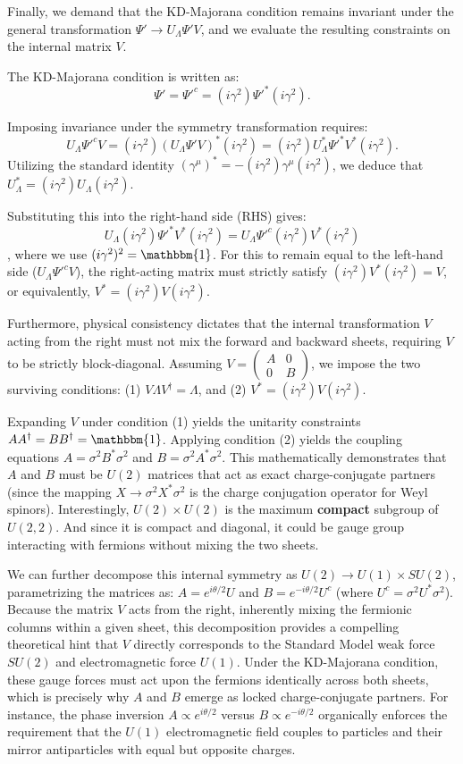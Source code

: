 Finally, we demand that the KD-Majorana condition remains invariant under the general transformation $\Psi'\to U_\Lambda\Psi'V$, and we evaluate the resulting constraints on the internal matrix $V$.

The KD-Majorana condition is written as: 
\[\Psi'=\Psi'^c =(i\gamma^2)\Psi'^*(i\gamma^2).\]

Imposing invariance under the symmetry transformation requires:
\[ U_\Lambda\Psi'^cV=(i\gamma^2)(U_\Lambda\Psi'V)^*(i\gamma^2)
    =(i\gamma^2)U_\Lambda^*\Psi'^*V^*(i\gamma^2). \]
Utilizing the standard identity $(\gamma^\mu)^*=-(i\gamma^2)\gamma^\mu(i\gamma^2)$, we deduce that $U_\Lambda^*=(i\gamma^2)U_\Lambda(i\gamma^2)$.

Substituting this into the right-hand side (RHS) gives: 
\[ U_\Lambda(i\gamma^2)\Psi'^*V^*(i\gamma^2)=U_\Lambda\Psi'^c(i\gamma^2)V^*(i\gamma^2)\], where we use $(i\gamma^2)^2=\mathbbm{1}$.
For this to remain equal to the left-hand side ($U_\Lambda\Psi'^cV$), the right-acting matrix must strictly satisfy $(i\gamma^2)V^*(i\gamma^2)=V$, or equivalently, $V^*=(i\gamma^2)V(i\gamma^2)$.

Furthermore, physical consistency dictates that the internal transformation $V$ acting from the right must not mix the forward and backward sheets, requiring $V$ to be strictly block-diagonal. 
Assuming $V=\begin{pmatrix} A & 0\\0&B\end{pmatrix}$, we impose the two surviving conditions: (1) $V\Lambda V^\dagger=\Lambda$, and (2) $V^*=(i\gamma^2)V(i\gamma^2)$.

Expanding $V$ under condition (1) yields the unitarity constraints $AA^\dagger=BB^\dagger=\mathbbm{1}$.
Applying condition (2) yields the coupling equations $A=\sigma^2B^*\sigma^2$ and $B=\sigma^2A^*\sigma^2$. 
This mathematically demonstrates that $A$ and $B$ must be $U(2)$ matrices that act as exact charge-conjugate partners (since the mapping $X\to \sigma^2 X^*\sigma^2$ is the charge conjugation operator for Weyl spinors). Interestingly, $U(2)\times U(2)$ is the maximum \textbf{compact} subgroup of $U(2,2)$. And since it is compact and diagonal, it could be gauge group interacting with fermions without mixing the two sheets. 

We can further decompose this internal symmetry as $U(2)\to U(1)\times SU(2)$, parametrizing the matrices as: 
$A=e^{i\theta/2}U$ and $B=e^{-i\theta/2}U^c$ (where $U^c=\sigma^2 U^*\sigma^2$). Because the matrix $V$ acts from the right, inherently mixing the fermionic columns within a given sheet, this decomposition provides a compelling theoretical hint that $V$ directly corresponds to the Standard Model weak force $SU(2)$ and electromagnetic force $U(1)$. Under the KD-Majorana condition, these gauge forces must act upon the fermions identically across both sheets, which is precisely why $A$ and $B$ emerge as locked charge-conjugate partners. For instance, the phase inversion $A\propto e^{i\theta/2}$ versus $B\propto e^{-i\theta/2}$ organically enforces the requirement that the $U(1)$ electromagnetic field couples to particles and their mirror antiparticles with equal but opposite charges. 

